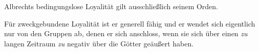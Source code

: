 
Albrechts bedingungslose Loyalität gilt ausschließlich seinem Orden.

Für zweckgebundene Loyalität ist er generell fähig und er wendet sich eigentlich nur von den Gruppen ab, denen er sich anschloss, wenn sie sich über einen \emph{zu} langen Zeitraum \emph{zu} negativ über die Götter geäußert haben.
